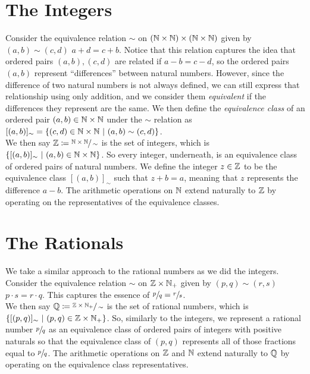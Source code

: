 \section{The Integers}
Consider the equivalence relation \(\sim\) on \(\pn*{\N \times \N} \times \pn*{\N \times \N}\)
given by \((a, b) \sim (c, d)\) \iffbydefn \(a + d = c + b\).
Notice that this relation captures the idea that ordered pairs \((a, b), (c, d)\) are related
if \(a - b = c - d\), so the ordered pairs \((a, b)\) represent ``differences'' between natural numbers.
However, since the difference of two natural numbers is not always defined,
we can still express that relationship using only addition,
and we consider them \emph{equivalent} if the differences they represent are the same.
We then define the \emph{equivalence class} of an ordered pair \((a, b) \in \mathbb{N} \times \mathbb{N}\) under the \(\sim\)
relation as \([(a, b)]_{\sim} = \set*{(c, d) \in \N \times \N \suchthat (a, b) \sim (c, d)}\).\\
We then say \(\mathbb{Z} \coloneqq \sfrac{\mathbb{N} \times \mathbb{N}}{\sim}\) is the set of integers,
which is \(\set*{[(a, b)]_{\sim} \suchthat (a, b) \in \N \times \N}\).
So every integer, underneath, is an equivalence class of ordered pairs of natural numbers.
We define the integer \(z \in \mathbb{Z}\) to be the equivalence class \([(a, b)]_{\sim}\) such that \(z + b = a\),
meaning that \(z\) represents the difference \(a - b\).
The arithmetic operations on \(\mathbb{N}\) extend naturally to \(\mathbb{Z}\)
by operating on the representatives of the equivalence classes.

\section{The Rationals}
We take a similar approach to the rational numbers as we did the integers.
Consider the equivalence relation \(\sim\) on \(\mathbb{Z} \times \mathbb{N}_+\)
given by \((p, q) \sim (r, s)\) \iffbydefn \(p \cdot s = r \cdot q\).
This captures the essence of \(\sfrac{p}{q} = \sfrac{r}{s}\).\\
We then say \(\mathbb{Q} \coloneqq \sfrac{\mathbb{Z} \times \mathbb{N}_+}{\sim}\) is the set of rational numbers,
which is \(\set*{[(p, q)]_{\sim} \suchthat (p, q) \in \Z \times \N_+}\).
So, similarly to the integers,
we represent a rational number \(\sfrac{p}{q}\)
as an equivalence class of ordered pairs of integers with positive naturals
so that the equivalence class of \((p, q)\) represents all of those fractions equal to \(\sfrac{p}{q}\).
The arithmetic operations on \(\mathbb{Z}\) and \(\mathbb{N}\) extend naturally to \(\mathbb{Q}\)
by operating on the equivalence class representatives.

